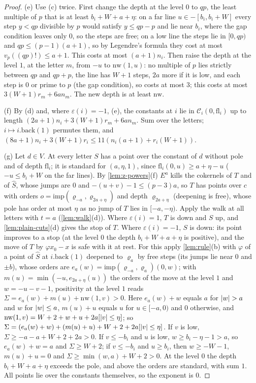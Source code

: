 \begin{proof}
(e) Use (c) twice. First change the depth at the level $0$ to $qp$, the least multiple of $p$ that is at least $b_i+W+a+\eta$: on a far line $u\in-[b_i,b_i+W]$ every step $y<qp$ divisible by $p$ would satisfy $y\le qp-p$ and lie near $b_i$, where the gap condition leaves only $0$, so the steps are free; on a low line the steps
lie in $[0,qp)$ and $qp\le(p-1)(a+1)$, so by Legendre's formula they cost at most $v_p((qp)!)\le a+1$. This costs at most $(a+1)n_i$. Then raise the depth at the level $1$, at the letter $m$, from $-u$ to $\mathrm{nw}(1,u)$: no multiple of $p$ lies strictly between $qp$ and $qp+p$, the line has $W+1$ steps, $2a$ more if it is
low, and each step is $0$ or prime to $p$ (the gap condition), so costs at most $3$; this costs at most $3(W+1)r_m+6an_m$. The new depth is at least $\mathrm{nw}$.

(f) By (d) and, where $\varepsilon(i)=-1$, (e), the constants at $i$ lie in $\mathcal C_i(0,\mathrm{fl}_i)$ up to length $(2a+1)n_i+3(W+1)r_m+6an_m$. Sum over the letters; $i\mapsto i.\mathrm{back}(1)$ permutes them, and $(8a+1)n_i+3(W+1)r_i\le11(n_i(a+1)+r_i(W+1))$.

(g) Let $d\in V$. At every letter $S$ has a point over the constant of $d$ without pole and of depth $\mathrm{fl}_i$; it is standard for $(a,\eta,1)$, since $\mathrm{fl}_i(0,u)\ge a+\eta-u$ ($-u\le b_i+W$ on the far lines). By \cref{lem:z-powers}(f) $E^a$ kills the cokernels of $T$ and of $\hat S$, whose jumps are $0$ and
$-(u+v)-1\le(p-3)a$, so $T$ has points over $c$ with orders $o=\mathrm{imp}(\varrho_{-a},\varrho_{2a+\eta})$ and depth $\varrho_{2a+\eta}$ (deepening is free), whose pole has order at most $\eta$ as no jump of $T$ lies in $[-a,-\eta)$. Apply the walk at all letters with $t=a$ (\cref{lem:walk}(d)). Where $\varepsilon(i)=1$, $T$ is down and $S$ up,
and \cref{lem:plain-cuts}(d) gives the stop of $T$. Where $\varepsilon(i)=-1$, $S$ is down: its point improves to a stop (at the level $0$ the depth $b_i+W+a+\eta$ is positive), and the move of $T$ by $\varphi x_0-x$ is safe with it at rest. For this apply \cref{lem:rule}(b) with $\varphi$ of a point of $\hat S$ at $i.\mathrm{back}(1)$ deepened to
$\varrho_a$ by free steps (its jumps lie near $0$ and $\pm b$), whose orders are $e_a(w)=\mathrm{imp}(\varrho_{-a},\varrho_a)(0,w)$; with $m(u)=\min(-u,e_{2a+\eta}(u))$ the orders of the move at the level $1$ and $w=-u-v-1$, positivity at the level $1$ reads $\Sigma=e_a(w)+m(u)+\mathrm{nw}(1,v)>0$. Here $e_a(w)+w$ equals $a$ for $\lvert w\rvert>a$ and
$w$ for $\lvert w\rvert\le a$, $m(u)+u$ equals $u$ for $u\in[-a,0)$ and $0$ otherwise, and $\mathrm{nw}(1,v)=W+2+w+u+2a[\lvert v\rvert\le\eta]$; so $\Sigma=(e_a(w)+w)+(m(u)+u)+W+2+2a[\lvert v\rvert\le\eta]$. If $v$ is low, $\Sigma\ge-a-a+W+2+2a>0$. If $v\le-b_i$ and $u$ is low, $w\ge b_i-\eta-1>a$, so $e_a(w)+w=a$ and $\Sigma\ge W+2$; if $v\le-b_i$ and
$u\ge b_i$, then $w\ge-W-1$, $m(u)+u=0$ and $\Sigma\ge\min(w,a)+W+2>0$. At the level $0$ the depth $b_i+W+a+\eta$ exceeds the pole, and above the orders are standard, with sum $1$. All points lie over the constants themselves, so the exponent is $0$.
\end{proof}

